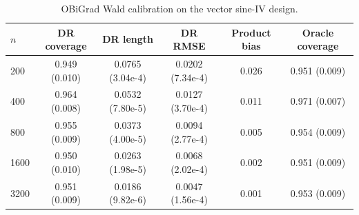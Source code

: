 \begin{table}[t]
\centering
\small
\setlength{\tabcolsep}{5pt}
\caption{OBiGrad Wald calibration on the vector sine-IV design.}
\label{tab:generated-iv-wald}
\begin{tabular}{lccccc}
\toprule
$n$ & DR coverage & DR length & DR RMSE & Product bias & Oracle coverage \\
\midrule
200 & 0.949 (0.010) & 0.0765 (3.04e-4) & 0.0202 (7.34e-4) & 0.026 & 0.951 (0.009) \\
400 & 0.964 (0.008) & 0.0532 (7.80e-5) & 0.0127 (3.70e-4) & 0.011 & 0.971 (0.007) \\
800 & 0.955 (0.009) & 0.0373 (4.00e-5) & 0.0094 (2.77e-4) & 0.005 & 0.954 (0.009) \\
1600 & 0.950 (0.010) & 0.0263 (1.98e-5) & 0.0068 (2.02e-4) & 0.002 & 0.951 (0.009) \\
3200 & 0.951 (0.009) & 0.0186 (9.82e-6) & 0.0047 (1.56e-4) & 0.001 & 0.953 (0.009) \\
\bottomrule
\end{tabular}
\end{table}
